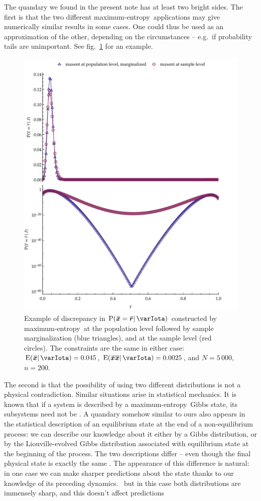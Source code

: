 \documentclass{article}
\theoremstyle{remark}
\theoremstyle{innote}
\newcommand*{\citep}{\parencites}
\renewcommand*{\cite}{\citep}
\renewcommand*{\|}{\mathpunct{|}}%
\newcommand*{\p}{\mathrm{P}}%
\newcommand*{\sect}{\S}%
\newcommand*{\fig}{fig.}%
\newcommand*{\eg}{{e.g.}}
\newcommand*{\E}{\mathrm{E}}
\DeclarePairedDelimiter\expp{(}{)}
\newcommand*{\expe}{\E\expp}%
\theoremstyle{simple}
\newcommand*{\puzzle}{{\fontencoding{U}\fontfamily{fontawesometwo}\selectfont\symbol{225}}}
\newcommand{\mynote}[1]{ {\color{notecolour}\puzzle\ #1}}
\newcommand*{\widebar}[1]{{\mkern1.5mu\skew{2}\overline{\mkern-1.5mu#1\mkern-1.5mu}\mkern 1.5mu}}
\newcommand*{\sav}{\widebar} %
\newcommand*{\yxx}{x}%
\newcommand*{\yx}{\bm{\yxx}}%
\newcommand*{\yxs}{\sav{\yx}}%
\newcommand*{\yxxs}{\sav{\yx\yx}}%
\newcommand*{\yr}{\bm{r}}%
\newcommand*{\yrs}{\sav{\yr}}%
\newcommand*{\yH}{\varIota}
\newcommand*{\me}{maximum-entropy}
\begin{document}
The quandary we found in the present note has at least two bright sides.
The first is that the two different \me\ applications may give numerically
similar results in some cases. One could thus be used as an approximation
of the other, depending on the circumstances -- \eg\ if probability tails
are unimportant. See \fig~\ref{fig:diff_maxent_pop_sample_realdata} for an
example.
\begin{figure}[!t]
\centering
\includegraphics[width=0.95\columnwidth]{different_maxent_pop_sample_200_realdata_both.pdf}
% 
\caption{Example of discrepancy in $\p(\yxs = \yrs \| \yH)$ constructed by
  \me\ at the population level followed by sample marginalization (blue
  triangles), and at the sample level (red circles). The constraints are
  the same in either case: $\expe{\yxs \|\yH}=0.045$,
  $\expe{\yxxs \|\yH}=0.0025$, and $N=5\,000$, $n=200$.}
\label{fig:diff_maxent_pop_sample_realdata}
\end{figure}%
The second is that the possibility of using two different distributions is
not a physical contradiction. Similar situations arise in statistical
mechanics. It is known that if a system is described by a \me\ Gibbs state,
its subsystems need not be \cite{maesetal1999}. A quandary somehow similar
to ours also appears in the statistical description of an equilibrium state
at the end of a non-equilibrium process: we can describe our knowledge
about it either by a Gibbs distribution, or by the Liouville-evolved Gibbs
distribution associated with equilibrium state at the beginning of the
process. The two descriptions differ -- even though the final physical
state is exactly the same \cite[\sect~4]{jaynes1985d_r1993}. The appearance
of this difference is natural: in one case we can make sharper predictions
about the state thanks to our knowledge of its preceding dynamics.
\mynote{but in this case both distributions are immensely sharp, and this
  doesn't affect predictions}
\end{document}
